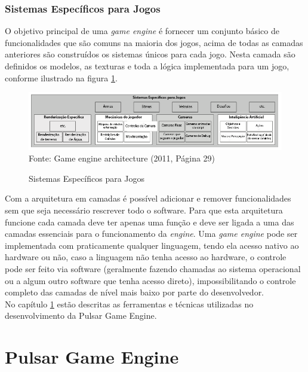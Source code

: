 \documentclass[12pt,	openright, twoside,	a4paper, english, french, spanish, brazil]{abntex2}
\begin{document}
\subsection{Sistemas Específicos para Jogos}
O objetivo principal de uma \textit{game engine} é fornecer um conjunto básico de funcionalidades que são comuns na maioria dos jogos, acima de todas as camadas anteriores são construídos os sistemas únicos para cada jogo. Nesta camada são definidos os modelos, as texturas e toda a lógica implementada para um jogo, conforme ilustrado na figura \ref{figura:arch_game}.

\begin{figure}[H]
\centering
\caption{Sistemas Específicos para Jogos}
\includegraphics[width=17cm]{imagens/arch-game.png}
\\
\small{Fonte: Game engine architecture (2011, Página 29)}
\label{figura:arch_game}
\end{figure}

%
%

Com a arquitetura em camadas é possível adicionar e remover funcionalidades sem que seja necessário rescrever todo o software. Para que esta arquitetura funcione cada camada deve ter apenas uma função e deve ser ligada a uma das camadas essenciais para o funcionamento da \textit{engine}. Uma \textit{game engine} pode ser implementada com praticamente qualquer linguagem, tendo ela acesso nativo ao hardware ou não, caso a linguagem não tenha acesso ao hardware, o controle pode ser feito via software (geralmente fazendo chamadas ao sistema operacional ou a algum outro software que tenha acesso direto), impossibilitando o controle completo das camadas de nível mais baixo por parte do desenvolvedor. \\
No capítulo \ref{cap: desenvolvimento} estão descritas as ferramentas e técnicas utilizadas no desenvolvimento da Pulsar Game Engine.


%
%

\chapter{Pulsar Game Engine} \label{cap: desenvolvimento}
\end{document}
